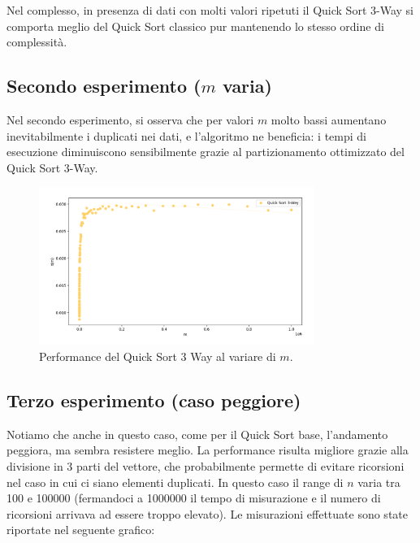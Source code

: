 \documentclass[a4paper, 12pt, oneside]{book}
\begin{document}
\noindent Nel complesso, in presenza di dati con molti valori ripetuti il Quick Sort 3-Way si comporta meglio del Quick Sort classico pur mantenendo lo stesso ordine di complessità.


\subsection{Secondo esperimento ($m$ varia)}

Nel secondo esperimento, si osserva che per valori \(m\) molto bassi aumentano inevitabilmente i duplicati nei dati, e l'algoritmo ne beneficia: i tempi di esecuzione diminuiscono sensibilmente grazie al partizionamento ottimizzato del Quick Sort 3-Way.

\begin{figure}[H]
    \centering
    \includegraphics[width=0.8\textwidth]{images/grafico_quick_sort_3_way_m.png}
    \caption{Performance del Quick Sort 3 Way al variare di \(m\).}
    \label{fig:quick_sort_3_way_m}
\end{figure}

\subsection{Terzo esperimento (caso peggiore)}

Notiamo che anche in questo caso, come per il Quick Sort base, l'andamento peggiora, ma sembra resistere meglio.
La performance risulta migliore grazie alla divisione in 3 parti del vettore, che probabilmente permette di evitare ricorsioni nel caso in cui ci siano elementi duplicati.
In questo caso il range di \(n\) varia tra 100 e 100000 (fermandoci a 1000000 il tempo di misurazione e il numero di ricorsioni arrivava ad essere troppo elevato). Le misurazioni effettuate sono state riportate nel seguente grafico:
\end{document}
